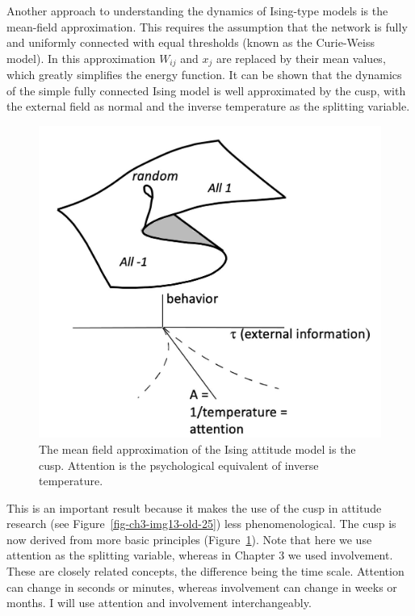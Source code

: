 \documentclass[
  a4paper,
  DIV=11,
  numbers=noendperiod,
  oneside]{scrreprt}
\begin{document}
Another approach to understanding the dynamics of Ising-type models is
the mean-field approximation. This requires the assumption that the
network is fully and uniformly connected with equal thresholds (known as
the Curie-Weiss model). In this approximation \(W_{ij}\) and \(x_{j}\)
are replaced by their mean values, which greatly simplifies the energy
function. It can be shown that the dynamics of the simple fully
connected Ising model is well approximated by the cusp, with the
external field as normal and the inverse temperature as the splitting
variable.

\begin{figure}

{\centering \includegraphics{media/ch6/image11.jpg}

}

\caption{\label{fig-ch6-img11-old-80}The mean field approximation of the
Ising attitude model is the cusp. Attention is the psychological
equivalent of inverse temperature.}

\end{figure}

This is an important result because it makes the use of the cusp in
attitude research (see Figure~\ref{fig-ch3-img13-old-25}) less
phenomenological. The cusp is now derived from more basic principles
(Figure~\ref{fig-ch6-img11-old-80}). Note that here we use attention as
the splitting variable, whereas in Chapter 3 we used involvement. These
are closely related concepts, the difference being the time scale.
Attention can change in seconds or minutes, whereas involvement can
change in weeks or months. I will use attention and involvement
interchangeably.
\end{document}
